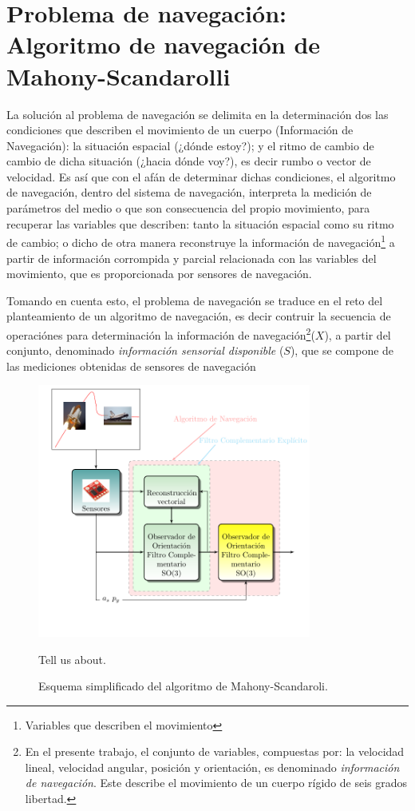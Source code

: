 \documentclass[conference]{IEEEtran}
\begin{document}
\section{Problema de navegación: Algoritmo de navegación de Mahony-Scandarolli}
La solución al problema de navegación se delimita en la determinación dos las condiciones que describen el movimiento de un cuerpo (Información de Navegación): la situación espacial (¿dónde estoy?); y el ritmo de cambio de cambio de dicha situación (¿hacia dónde voy?), es decir rumbo o vector de velocidad. Es así que con el afán de determinar dichas condiciones, el algoritmo de navegación, dentro del sistema de navegación, interpreta la medición de parámetros del medio o que son consecuencia del propio movimiento, para recuperar las variables que describen: tanto la situación espacial como su ritmo de cambio; o dicho de otra manera reconstruye la información de navegación\footnote{Variables que describen el movimiento} a partir de información corrompida y parcial relacionada con las variables del movimiento, que es proporcionada por sensores de navegación.\par
Tomando en cuenta esto, el problema de navegación se traduce en el reto del planteamiento de un algoritmo de navegación, es decir contruir la secuencia de operaciónes para determinación la información de navegación\footnote{En el presente trabajo, el conjunto de variables, compuestas por: la velocidad lineal, velocidad angular, posición y orientación, es denominado \emph{información de navegación}. Este describe el movimiento de un cuerpo rígido de seis grados libertad.}($X$), a partir del conjunto, denominado \emph{información sensorial disponible} ($S$), que se compone de las mediciones obtenidas de sensores de navegación\par
\begin{figure}
\begin{center}
\includegraphics[width=9cm,clip]{intro_fig4.pdf}
\caption{Esquema simplificado del algoritmo de Mahony-Scandaroli.}
\scriptsize{Tell us about.}
\label{solucionMS_fig1}
\end{center}
\end{figure}
\end{document}
